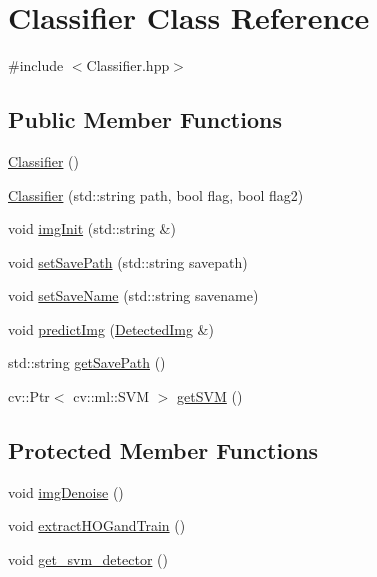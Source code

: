 \hypertarget{classClassifier}{}\section{Classifier Class Reference}
\label{classClassifier}


{\ttfamily \#include $<$Classifier.\+hpp$>$}

\subsection*{Public Member Functions}
\begin{DoxyCompactItemize}
\item 
\hyperlink{classClassifier_ae6132b100c96a4f3d8ad3885b5acb28e}{Classifier} ()
\item 
\hyperlink{classClassifier_a7fde1d08d4bf994fab56cf84640a257f}{Classifier} (std\+::string path, bool flag, bool flag2)
\item 
void \hyperlink{classClassifier_a226bbcc78831d8693439f4ba23e1bcd0}{img\+Init} (std\+::string \&)
\item 
void \hyperlink{classClassifier_aa93a43ffaf16d1add48216a913d3ba9a}{set\+Save\+Path} (std\+::string savepath)
\item 
void \hyperlink{classClassifier_a0825644115b10e52451660dd601fd2a1}{set\+Save\+Name} (std\+::string savename)
\item 
void \hyperlink{classClassifier_a66f6ef3aeb96c2dd10d23bd5f50626ef}{predict\+Img} (\hyperlink{classDetectedImg}{Detected\+Img} \&)
\item 
std\+::string \hyperlink{classClassifier_a93b6aa34418d79a49cf0ded88b4ba463}{get\+Save\+Path} ()
\item 
cv\+::\+Ptr$<$ cv\+::ml\+::\+S\+VM $>$ \hyperlink{classClassifier_a6c8d55cc96aaa9b5ed65535ac96cd569}{get\+S\+VM} ()
\end{DoxyCompactItemize}
\subsection*{Protected Member Functions}
\begin{DoxyCompactItemize}
\item 
void \hyperlink{classClassifier_a757b662071b067bbe507992baf6d7d3e}{img\+Denoise} ()
\item 
void \hyperlink{classClassifier_a139a8a52249fdacc8e0a00400fa18183}{extract\+H\+O\+Gand\+Train} ()
\item 
void \hyperlink{classClassifier_a9441d5066b62e74707d10af1a1b5e6ae}{get\+\_\+svm\+\_\+detector} ()
\end{DoxyCompactItemize}
